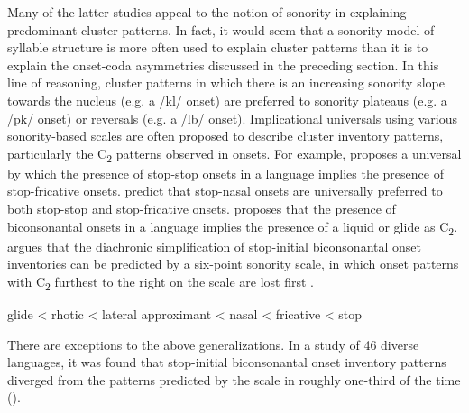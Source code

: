   Many of the latter studies appeal to the notion of sonority in explaining predominant cluster patterns. In fact, it would seem that a sonority model of syllable structure is more often used to explain cluster patterns than it is to explain the onset-coda asymmetries discussed in the preceding section. In this line of reasoning, cluster patterns in which there is an increasing sonority slope towards the nucleus (e.g. a /kl/ onset) are preferred to sonority plateaus (e.g. a /pk/ onset) or reversals (e.g. a /lb/ onset). Implicational universals using various sonority-based scales are often proposed to describe cluster inventory patterns, particularly the C\textsubscript{2} patterns observed in onsets. For example, \citet{Morelli1999} proposes a universal by which the presence of stop-stop onsets in a language implies the presence of stop-fricative onsets. \citet{LennertzBerent2015} predict that stop-nasal onsets are universally preferred to both stop-stop and stop-fricative onsets. \citet{Parker2012} proposes that the presence of biconsonantal onsets in a language implies the presence of a liquid or glide as C\textsubscript{2}. \citet{Vennemann2012} argues that the diachronic simplification of stop-initial biconsonantal onset inventories can be predicted by a six-point sonority scale, in which onset patterns with C\textsubscript{2} furthest to the right on the scale are lost first .

\ea\label{ex:1.7}
  glide < rhotic < lateral approximant < nasal < fricative < stop
\z

  There are exceptions to the above generalizations. In a study of 46 diverse languages, it was found that stop-initial biconsonantal onset inventory patterns diverged from the patterns predicted by the scale in  roughly one-third of the time (\citealt{EasterdayNapoleãodeSouza2015}). 

